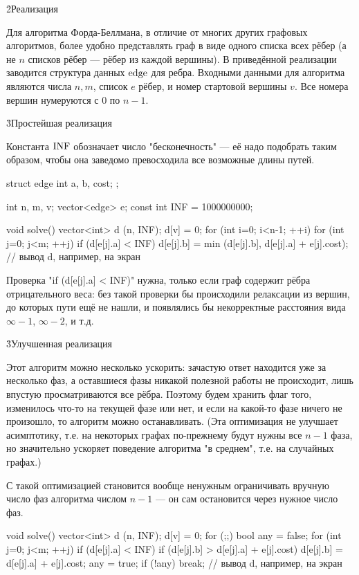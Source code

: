 \h2{Реализация}

Для алгоритма Форда-Беллмана, в отличие от многих других графовых алгоритмов, более удобно представлять граф в виде одного списка всех рёбер (а не $n$ списков рёбер --- рёбер из каждой вершины). В приведённой реализации заводится структура данных $\rm edge$ для ребра. Входными данными для алгоритма являются числа $n, m$, список $e$ рёбер, и номер стартовой вершины $v$. Все номера вершин нумеруются с $0$ по $n-1$.

\h3{Простейшая реализация}

Константа $\rm INF$ обозначает число "бесконечность" --- её надо подобрать таким образом, чтобы она заведомо превосходила все возможные длины путей.

\code
struct edge {
	int a, b, cost;
};

int n, m, v;
vector<edge> e;
const int INF = 1000000000;

void solve() {
	vector<int> d (n, INF);
	d[v] = 0;
	for (int i=0; i<n-1; ++i)
		for (int j=0; j<m; ++j)
			if (d[e[j].a] < INF)
				d[e[j].b] = min (d[e[j].b], d[e[j].a] + e[j].cost);
	// вывод d, например, на экран
}
\endcode

Проверка "if (d[e[j].a] < INF)" нужна, только если граф содержит рёбра отрицательного веса: без такой проверки бы происходили релаксации из вершин, до которых пути ещё не нашли, и появлялись бы некорректные расстояния вида $\infty - 1$, $\infty - 2$, и т.д.

\h3{Улучшенная реализация}

Этот алгоритм можно несколько ускорить: зачастую ответ находится уже за несколько фаз, а оставшиеся фазы никакой полезной работы не происходит, лишь впустую просматриваются все рёбра. Поэтому будем хранить флаг того, изменилось что-то на текущей фазе или нет, и если на какой-то фазе ничего не произошло, то алгоритм можно останавливать. (Эта оптимизация не улучшает асимптотику, т.е. на некоторых графах по-прежнему будут нужны все $n-1$ фаза, но значительно ускоряет поведение алгоритма "в среднем", т.е. на случайных графах.)

С такой оптимизацией становится вообще ненужным ограничивать вручную число фаз алгоритма числом $n-1$ --- он сам остановится через нужное число фаз.

\code
void solve() {
	vector<int> d (n, INF);
	d[v] = 0;
	for (;;) {
		bool any = false;
		for (int j=0; j<m; ++j)
			if (d[e[j].a] < INF)
				if (d[e[j].b] > d[e[j].a] + e[j].cost) {
					d[e[j].b] = d[e[j].a] + e[j].cost;
					any = true;
				}
		if (!any)  break;
	}
	// вывод d, например, на экран
}
\endcode

